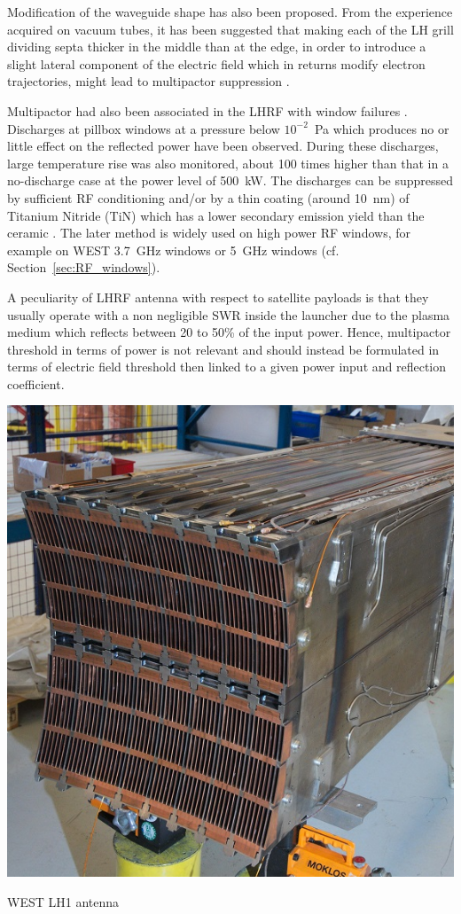 Modification of the waveguide shape has also been proposed. From the experience acquired on vacuum tubes, it has been suggested that making each of the LH grill dividing septa thicker in the middle than at the edge, in order to introduce a slight lateral component of the electric field which in returns modify electron trajectories, might lead to multipactor suppression .

Multipactor had also been associated in the LHRF with window failures . Discharges at pillbox windows at a pressure below $10^{-2}$~Pa which produces no or little effect on the reflected power have been observed. During these discharges, large temperature rise was also monitored, about 100 times higher than that in a no-discharge case at the power level of 500~kW. The discharges can be suppressed by sufficient RF conditioning and/or by a thin coating (around 10~nm) of Titanium Nitride (TiN) which has a lower secondary emission yield than the ceramic . The later method is widely used on high power RF windows, for example on WEST 3.7~GHz windows  or 5~GHz windows  (cf. Section~\ref{sec:RF_windows}).


A peculiarity of LHRF antenna with respect to satellite payloads is that they usually operate with a non negligible SWR inside the launcher due to the plasma medium which reflects between 20 to 50\% of the input power. Hence, multipactor threshold in terms of power is not relevant and should instead be formulated in terms of electric field threshold then linked to a given power input and reflection coefficient. 

\begin{marginfigure}[-1cm]
	\centering
	\includegraphics[width=0.9\linewidth]{figures/chap4/WEST_LH1}
	\caption{WEST LH1 antenna}
	\label{fig:westlh1}
\end{marginfigure}


